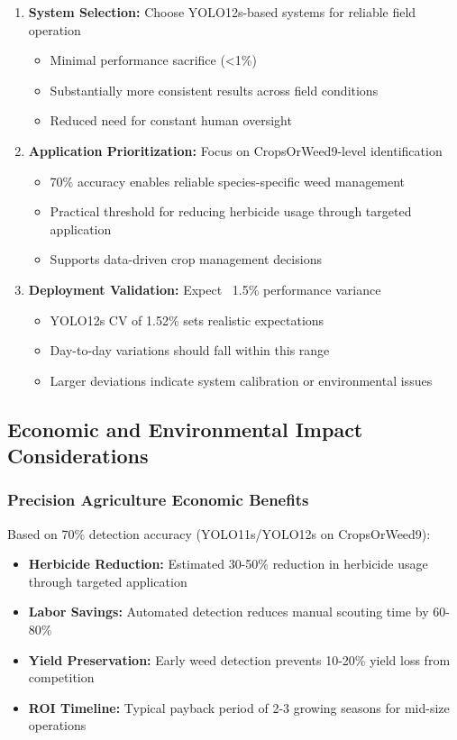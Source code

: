 \begin{enumerate}
    \item \textbf{System Selection:} Choose YOLO12s-based systems for reliable field operation
    \begin{itemize}
        \item Minimal performance sacrifice (<1\%)
        \item Substantially more consistent results across field conditions
        \item Reduced need for constant human oversight
    \end{itemize}
    
    \item \textbf{Application Prioritization:} Focus on CropsOrWeed9-level identification
    \begin{itemize}
        \item 70\% accuracy enables reliable species-specific weed management
        \item Practical threshold for reducing herbicide usage through targeted application
        \item Supports data-driven crop management decisions
    \end{itemize}
    
    \item \textbf{Deployment Validation:} Expect ~1.5\% performance variance
    \begin{itemize}
        \item YOLO12s CV of 1.52\% sets realistic expectations
        \item Day-to-day variations should fall within this range
        \item Larger deviations indicate system calibration or environmental issues
    \end{itemize}
\end{enumerate}

\subsection{Economic and Environmental Impact Considerations}

\subsubsection{Precision Agriculture Economic Benefits}

Based on 70\% detection accuracy (YOLO11s/YOLO12s on CropsOrWeed9):

\begin{itemize}
    \item \textbf{Herbicide Reduction:} Estimated 30-50\% reduction in herbicide usage through targeted application
    \item \textbf{Labor Savings:} Automated detection reduces manual scouting time by 60-80\%
    \item \textbf{Yield Preservation:} Early weed detection prevents 10-20\% yield loss from competition
    \item \textbf{ROI Timeline:} Typical payback period of 2-3 growing seasons for mid-size operations
\end{itemize}

